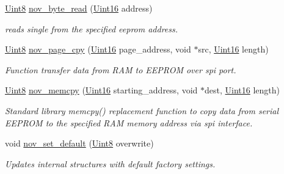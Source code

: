 \begin{DoxyCompactItemize}
\hyperlink{a00072_af84840501dec18061d18a68c162a8fa2}{Uint8} \hyperlink{a00060_adf5af9eb34f1cd301648dfa3c71fe392}{nov\+\_\+byte\+\_\+read} (\hyperlink{a00072_a59a9f6be4562c327cbfb4f7e8e18f08b}{Uint16} address)
\begin{DoxyCompactList}\small\item\em reads single from the specified eeprom address. \end{DoxyCompactList}\item 
\hyperlink{a00072_af84840501dec18061d18a68c162a8fa2}{Uint8} \hyperlink{a00060_aeb021b0e002db120ad733c24f3e179bc}{nov\+\_\+page\+\_\+cpy} (\hyperlink{a00072_a59a9f6be4562c327cbfb4f7e8e18f08b}{Uint16} page\+\_\+address, void $\ast$src, \hyperlink{a00072_a59a9f6be4562c327cbfb4f7e8e18f08b}{Uint16} length)
\begin{DoxyCompactList}\small\item\em Function transfer data from R\+A\+M to E\+E\+P\+R\+O\+M over spi port. \end{DoxyCompactList}\item 
\hyperlink{a00072_af84840501dec18061d18a68c162a8fa2}{Uint8} \hyperlink{a00060_a3ff681f3af83ec441535611dac6ada16}{nov\+\_\+memcpy} (\hyperlink{a00072_a59a9f6be4562c327cbfb4f7e8e18f08b}{Uint16} starting\+\_\+address, void $\ast$dest, \hyperlink{a00072_a59a9f6be4562c327cbfb4f7e8e18f08b}{Uint16} length)
\begin{DoxyCompactList}\small\item\em Standard library memcpy() replacement function to copy data from serial E\+E\+P\+R\+O\+M to the specified R\+A\+M memory address via spi interface. \end{DoxyCompactList}\item 
void \hyperlink{a00060_ada4ee53cb163a9ed3e2b4a5c7192690a}{nov\+\_\+set\+\_\+default} (\hyperlink{a00072_af84840501dec18061d18a68c162a8fa2}{Uint8} overwrite)
\begin{DoxyCompactList}\small\item\em Updates internal structures with default factory settings. \end{DoxyCompactList}\end{DoxyCompactItemize}
